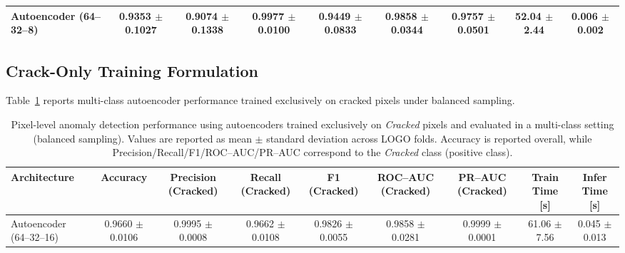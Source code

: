 \begin{landscape}
\begin{table}[!htbp]
\begin{adjustbox}{max width=\linewidth,center}
\begin{tabular}{@{}lcccccccc@{}}
        Autoencoder (64--32--8)
        & 0.9353 $\pm$ 0.1027
        & 0.9074 $\pm$ 0.1338
        & 0.9977 $\pm$ 0.0100
        & 0.9449 $\pm$ 0.0833
        & 0.9858 $\pm$ 0.0344
        & 0.9757 $\pm$ 0.0501
        & 52.04 $\pm$ 2.44
        & 0.006 $\pm$ 0.002 \\

        \bottomrule
    \end{tabular}
    \end{adjustbox}
\end{table}

\subsection{Crack-Only Training Formulation}

\noindent
Table~\ref{tab:autoencoder_pixel_results_crack_only_multiclass_balanced} reports multi-class autoencoder performance trained exclusively on cracked pixels under balanced sampling.


\begin{table}[!htbp]
    \centering
    \caption[Autoencoder anomaly detection: CRACK-only balanced (full CV)]{Pixel-level anomaly detection performance using autoencoders trained exclusively on \textit{Cracked} pixels and evaluated in a multi-class setting (balanced sampling).
    Values are reported as mean $\pm$ standard deviation across LOGO folds.
    Accuracy is reported overall, while Precision/Recall/F1/ROC--AUC/PR--AUC correspond to the \textit{Cracked} class (positive class).}
    \label{tab:autoencoder_pixel_results_crack_only_multiclass_balanced}
    \small
    \renewcommand{\arraystretch}{1.25}
    \setlength{\tabcolsep}{7pt}
    \begin{adjustbox}{max width=\linewidth,center}
    \begin{tabular}{@{}lcccccccc@{}}
        \toprule
        Architecture &
        Accuracy &
        Precision (Cracked) &
        Recall (Cracked) &
        F1 (Cracked) &
        ROC--AUC (Cracked) &
        PR--AUC (Cracked) &
        Train Time [s] &
        Infer Time [s] \\
        \midrule

        Autoencoder (64--32--16)
        & 0.9660 $\pm$ 0.0106
        & 0.9995 $\pm$ 0.0008
        & 0.9662 $\pm$ 0.0108
        & 0.9826 $\pm$ 0.0055
        & 0.9858 $\pm$ 0.0281
        & 0.9999 $\pm$ 0.0001
        & 61.06 $\pm$ 7.56
        & 0.045 $\pm$ 0.013 \\


\end{tabular}
\end{adjustbox}
\end{table}
\end{landscape}
